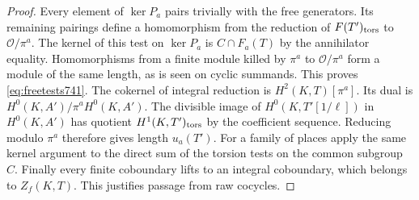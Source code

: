 \documentclass[a4paper,11pt]{article}
\theoremstyle{definition}
\theoremstyle{remark}
\numberwithin{equation}{section}
\begin{document}
\begin{proof}
Every element of \(\ker P_a\) pairs trivially with the free
generators. Its remaining pairings define a homomorphism from the
reduction of \(F(T')_{\rm tors}\) to \(\mathcal O/\pi^a\). The
kernel of this test on \(\ker P_a\) is \(C\cap F_a(T)\) by the
annihilator equality. Homomorphisms from a finite module killed by
\(\pi^a\) to \(\mathcal O/\pi^a\) form a module of the same length,
as is seen on cyclic summands. This proves \eqref{eq:freetests741}.
The cokernel of integral reduction is \(H^2(K,T)[\pi^a]\).
Its dual is \(H^0(K,A')/\pi^a H^0(K,A')\). The divisible image of
\(H^0(K,T'[1/\ell])\) in \(H^0(K,A')\) has quotient
\(H^1(K,T')_{\rm tors}\) by the coefficient sequence. Reducing
modulo \(\pi^a\) therefore gives length \(u_a(T')\). For a family
of places apply the same kernel argument to the direct sum of
the torsion tests on the common subgroup \(C\). Finally every
finite coboundary lifts to an integral coboundary, which belongs
to \(Z_f(K,T)\). This justifies passage from raw cocycles.
\end{proof}
\end{document}
